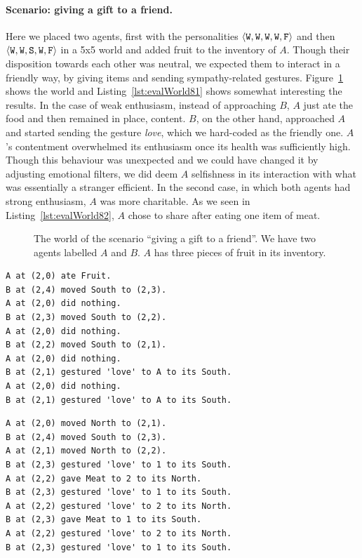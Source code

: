 \paragraph{Scenario: giving a gift to a friend.} Here we placed two agents, first with the personalities $\langle \mathtt{W},\mathtt{W}, \mathtt{W}, \mathtt{W}, \mathtt{F} \rangle$ and then $\langle \mathtt{W},\mathtt{W}, \mathtt{S}, \mathtt{W}, \mathtt{F} \rangle$ in a 5x5 world and added fruit to the inventory of $A$. Though their disposition towards each other was neutral, we expected them to interact in a friendly way, by giving items and sending sympathy-related gestures. Figure~\ref{fig:evalWorld8} shows the world and Listing~\ref{lst:evalWorld81} shows somewhat interesting the results. In the case of weak enthusiasm, instead of approaching $B$, $A$ just ate the food and then remained in place, content. $B$, on the other hand, approached $A$ and started sending the gesture \emph{love}, which we hard-coded as the friendly one. $A$'s contentment overwhelmed its enthusiasm once its health was sufficiently high. Though this behaviour was unexpected and we could have changed it by adjusting emotional filters, we did deem $A$ selfishness in its interaction with what was essentially a stranger efficient. In the second case, in which both agents had strong enthusiasm, $A$ was more charitable. As we seen in Listing~\ref{lst:evalWorld82}, $A$ chose to share after eating one item of meat.

\begin{figure}
    \centering
    
    \caption{The world of the scenario ``giving a gift to a friend''. We have two agents labelled $A$ and $B$. $A$ has three pieces of fruit in its inventory.}
    \label{fig:evalWorld8}
\end{figure}

\begin{lstlisting}[caption=Actions in the scenario ``giving a gift to a friend'' when both agents had the personality $\personality{W}{W}{W}{W}{F}$., label=lst:evalWorld81]
A at (2,0) ate Fruit.
B at (2,4) moved South to (2,3).
A at (2,0) did nothing.
B at (2,3) moved South to (2,2).
A at (2,0) did nothing.
B at (2,2) moved South to (2,1).
A at (2,0) did nothing.
B at (2,1) gestured 'love' to A to its South.
A at (2,0) did nothing.
B at (2,1) gestured 'love' to A to its South.
\end{lstlisting}

\begin{lstlisting}[caption=Actions in the scenario ``giving a gift to a friend'' when both agents had the personality $\personality{W}{W}{S}{W}{F}$., label=lst:evalWorld82]
A at (2,0) moved North to (2,1).
B at (2,4) moved South to (2,3).
A at (2,1) moved North to (2,2).
B at (2,3) gestured 'love' to 1 to its South.
A at (2,2) gave Meat to 2 to its North.
B at (2,3) gestured 'love' to 1 to its South.
A at (2,2) gestured 'love' to 2 to its North.
B at (2,3) gave Meat to 1 to its South.
A at (2,2) gestured 'love' to 2 to its North.
B at (2,3) gestured 'love' to 1 to its South.
\end{lstlisting}


